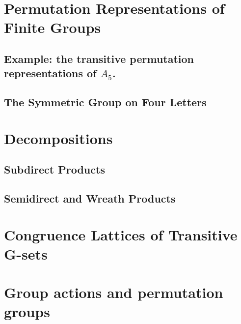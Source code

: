 

\section{Permutation Representations of Finite Groups}
\label{sec:introduction}

\subsection{Example:  the transitive permutation representations of $A_5$.}
\label{subsection-a5}



\subsection{The Symmetric Group on Four Letters}



\newpage

\section{Decompositions}
\subsection{Subdirect Products}


\subsection{Semidirect and Wreath Products}


\newpage

\section{Congruence Lattices of Transitive G-sets}


\newpage
\section{Group actions and permutation groups}


